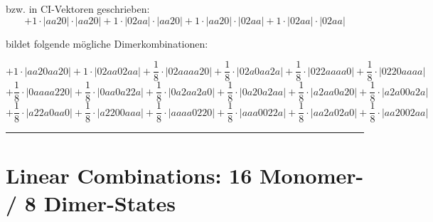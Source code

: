 \documentclass{article}
\begin{document}
\begin{minipage}{\linewidth}
bzw. in CI-Vektoren geschrieben: 
 $$+ 1 \cdot \left|aa20 \right| \cdot \left| aa20 \right| 
+ 1 \cdot \left|02aa \right| \cdot \left| aa20 \right| 
+ 1 \cdot \left|aa20 \right| \cdot \left| 02aa \right| 
+ 1 \cdot \left|02aa \right| \cdot \left| 02aa \right| 
$$



 bildet folgende mögliche Dimerkombinationen:

$$+ 1 \cdot \left|aa20aa20 \right| + 1 \cdot \left|02aa02aa \right| + \frac{1}{8} \cdot \left|02aaaa20 \right| + \frac{1}{8} \cdot \left|02a0aa2a \right| + \frac{1}{8} \cdot \left|022aaaa0 \right| + \frac{1}{8} \cdot \left|0220aaaa \right|  $$ $$ + \frac{1}{8} \cdot \left|0aaaa220 \right| + \frac{1}{8} \cdot \left|0aa0a22a \right| + \frac{1}{8} \cdot \left|0a2aa2a0 \right| + \frac{1}{8} \cdot \left|0a20a2aa \right| + \frac{1}{8} \cdot \left|a2aa0a20 \right| + \frac{1}{8} \cdot \left|a2a00a2a \right|  $$ $$ + \frac{1}{8} \cdot \left|a22a0aa0 \right| + \frac{1}{8} \cdot \left|a2200aaa \right| + \frac{1}{8} \cdot \left|aaaa0220 \right| + \frac{1}{8} \cdot \left|aaa0022a \right| + \frac{1}{8} \cdot \left|aa2a02a0 \right| + \frac{1}{8} \cdot \left|aa2002aa \right| $$



\end{minipage}
\vspace{0.5cm}
\hrule
\vspace{0.5cm}


\newpage

\section{Linear Combinations: 16 Monomer- / 8 Dimer-States}
\end{document}
